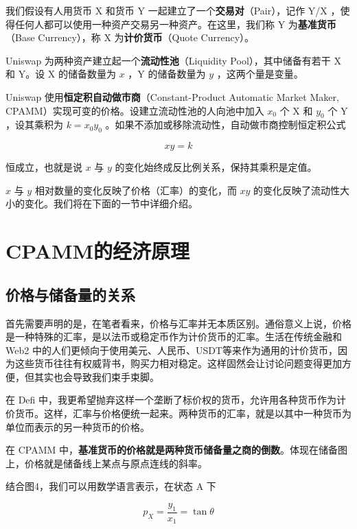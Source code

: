 \documentclass[12pt, a4paper, oneside]{ctexart}
\begin{document}
我们假设有人用货币 X 和货币 Y 一起建立了一个\textbf{交易对}（Pair），记作 Y/X ，使得任何人都可以使用一种资产交易另一种资产。在这里，我们称 Y 为\textbf{基准货币}（Base Currency），称 X 为\textbf{计价货币}（Quote Currency）。

Uniswap 为两种资产建立起一个\textbf{流动性池}（Liquidity Pool），其中储备有若干 X 和 Y。设 X 的储备数量为 $x$ ，Y 的储备数量为 $y$ ，这两个量是变量。

Uniswap 使用\textbf{恒定积自动做市商}（Constant-Product Automatic Market Maker, CPAMM）实现可变的价格。设建立流动性池的人向池中加入 $x_0$ 个 X 和 $y_0$ 个 Y ，设其乘积为 $k=x_0y_0$ 。如果不添加或移除流动性，自动做市商控制恒定积公式

\begin{equation}
    xy=k 
\end{equation}

\noindent 恒成立，也就是说 $x$ 与 $y$ 的变化始终成反比例关系，保持其乘积是定值。

$x$ 与 $y$ 相对数量的变化反映了价格（汇率）的变化，而 $xy$ 的变化反映了流动性大小的变化。我们将在下面的一节中详细介绍。

\section{CPAMM的经济原理}

\subsection{价格与储备量的关系}

首先需要声明的是，在笔者看来，价格与汇率并无本质区别。通俗意义上说，价格是一种特殊的汇率，是以法币或稳定币作为计价货币的汇率。生活在传统金融和 Web2 中的人们更倾向于使用美元、人民币、USDT等来作为通用的计价货币，因为这些货币往往有权威背书，购买力相对稳定。这样固然会让讨论问题变得更加方便，但其实也会导致我们束手束脚。

在 Defi 中，我更希望抛弃这样一个垄断了标价权的货币，允许用各种货币作为计价货币。这样，汇率与价格便统一起来。两种货币的汇率，就是以其中一种货币为单位而表示的另一种货币的价格。

在 CPAMM 中，\textbf{基准货币的价格就是两种货币储备量之商的倒数}。体现在储备图上，价格就是储备线上某点与原点连线的斜率。

结合图4，我们可以用数学语言表示，在状态 A 下

\begin{equation}
    p_X = \frac{y_1}{x_1} = \tan \theta
\end{equation}
\end{document}

